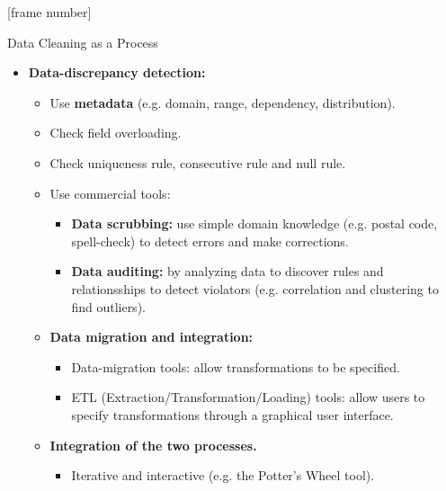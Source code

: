 \documentclass[aspectratio=169,t]{beamer}
\begin{document}
 {
    [frame number]
    \begin{frame}{Data Cleaning as a Process}
    \begin{itemize}
      \item \textbf{Data-discrepancy detection:}
      \begin{itemize}
        \item Use \textbf{\color{airforceblue}metadata} (e.g. domain, range, dependency, distribution).
        \item Check field overloading.
        \item Check uniqueness rule, consecutive rule and null rule.
        \item Use commercial tools:
        \begin{itemize}
          \item \textbf{\color{airforceblue}Data scrubbing:} use simple domain knowledge (e.g. postal code, spell-check) to detect errors and make corrections.
          \item \textbf{\color{airforceblue}Data auditing:} by analyzing data to discover rules and relationsships to detect violators (e.g. correlation and clustering to find outliers).
        \end{itemize}
        \item \textbf{Data migration and integration:}
        \begin{itemize}
          \item Data-migration tools: allow transformations to be specified.
          \item ETL (Extraction/Transformation/Loading) tools: allow users to specify transformations through a graphical user interface.
        \end{itemize}
        \item \textbf{Integration of the two processes.}
        \begin{itemize}
          \item Iterative and interactive (e.g. the Potter's Wheel tool).
        \end{itemize}
      \end{itemize}
    \end{itemize}
    \end{frame}
  }
\end{document}
